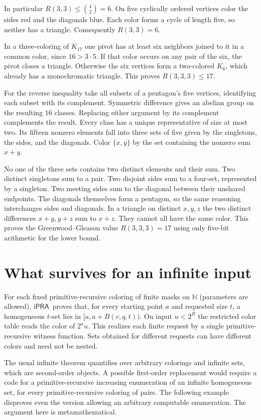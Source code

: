 \documentclass[11pt,letterpaper]{article}
\newcommand{\N}{\mathbb N}
\newcommand{\ipra}{\ensuremath{\mathsf{iPRA}}}
\newcommand{\head}[1]{\section{#1}}
\newcommand{\point}[1]{\par\smallskip{\bfseries\color{ink}#1.}\enspace}
\begin{document}
In particular $R(3,3)\le\binom42=6$. On five cyclically ordered vertices color the sides red and the diagonals blue. Each color forms a cycle of length five, so neither has a triangle. Consequently $R(3,3)=6$.

\point{Three colors} In a three-coloring of $K_{17}$ one pivot has at least six neighbors joined to it in a common color, since $16>3\cdot5$. If that color occurs on any pair of the six, the pivot closes a triangle. Otherwise the six vertices form a two-colored $K_6$, which already has a monochromatic triangle. This proves $R(3,3,3)\le17$.

For the reverse inequality take all subsets of a pentagon's five vertices, identifying each subset with its complement. Symmetric difference gives an abelian group on the resulting $16$ classes. Replacing either argument by its complement complements the result. Every class has a unique representative of size at most two. Its fifteen nonzero elements fall into three sets of five given by the singletons, the sides, and the diagonals. Color $\{x,y\}$ by the set containing the nonzero sum $x+y$.

No one of the three sets contains two distinct elements and their sum. Two distinct singletons sum to a pair. Two disjoint sides sum to a four-set, represented by a singleton. Two meeting sides sum to the diagonal between their unshared endpoints. The diagonals themselves form a pentagon, so the same reasoning interchanges sides and diagonals. In a triangle on distinct $x,y,z$ the two distinct differences $x+y,y+z$ sum to $x+z$. They cannot all have the same color. This proves the Greenwood--Gleason value $R(3,3,3)=17$ \cite{gg} using only five-bit arithmetic for the lower bound.
\clearpage

\head{What survives for an infinite input}\label{s:inf}
For each fixed primitive-recursive coloring of finite masks on $\N$ (parameters are allowed), \ipra\ proves that, for every starting point $a$ and requested size $t$, a homogeneous $t$-set lies in $[a,a+B(r,q,t))$. On input $u<2^B$ the restricted color table reads the color of $2^a u$. This realizes each finite request by a single primitive-recursive witness function. Sets obtained for different requests can have different colors and need not be nested.

The usual infinite theorem quantifies over arbitrary colorings and infinite sets, which are second-order objects. A possible first-order replacement would require a code for a primitive-recursive increasing enumeration of an infinite homogeneous set, for every primitive-recursive coloring of pairs. The following example disproves even the version allowing an arbitrary computable enumeration. The argument here is metamathematical.
\end{document}
